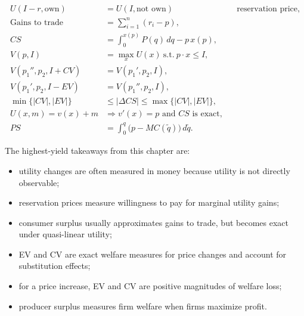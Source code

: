 \begin{keyformula}[title={Key Formula: Lecture 7 Summary}]
\begin{align*}
U(I-r,\text{own}) &= U(I,\text{not own}) && \text{reservation price}, \\
\text{Gains to trade} &= \sum_{i=1}^{n}(r_i-p), \\
CS &= \int_0^{x(p)} P(q)\,dq - p\,x(p), \\
V(p,I) &= \max_x U(x) \ \text{s.t.}\ p\cdot x \le I, \\
V(p_1'',p_2,I+CV) &= V(p_1',p_2,I), \\
V(p_1',p_2,I-EV) &= V(p_1'',p_2,I), \\
\min\{|CV|,|EV|\} &\le |\Delta CS| \le \max\{|CV|,|EV|\}, \\
U(x,m)=v(x)+m &\Rightarrow v'(x)=p \text{ and } CS \text{ is exact}, \\
PS &= \int_0^q \bigl(p-MC(\tilde q)\bigr)\,d\tilde q.
\end{align*}
\end{keyformula}

\begin{examtip}
The highest-yield takeaways from this chapter are:
\begin{itemize}
    \item utility changes are often measured in money because utility is not directly observable;
    \item reservation prices measure willingness to pay for marginal utility gains;
    \item consumer surplus usually approximates gains to trade, but becomes exact under quasi-linear utility;
    \item EV and CV are exact welfare measures for price changes and account for substitution effects;
    \item for a price increase, EV and CV are positive magnitudes of welfare loss;
    \item producer surplus measures firm welfare when firms maximize profit.
\end{itemize}
\end{examtip}